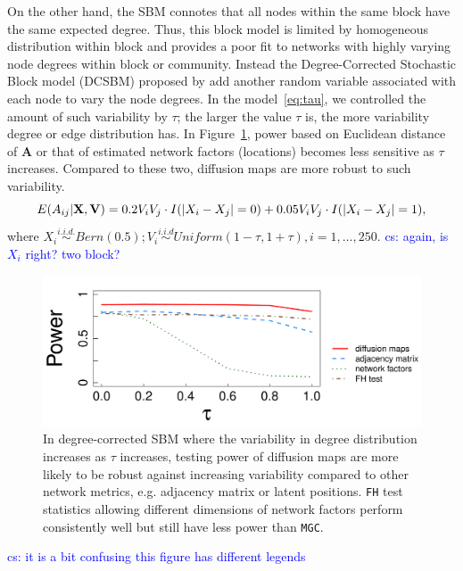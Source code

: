 \documentclass[11pt]{article}
\theoremstyle{definition}
\newcommand{\cs}[1]{\textcolor{blue}{cs: #1}}
\begin{document}
On the other hand, the SBM connotes that all nodes within the same block have the same expected degree. Thus, this block model is limited by homogeneous distribution within block and provides a poor fit to networks with highly varying node degrees within block or community. Instead the Degree-Corrected Stochastic Block model (DCSBM) proposed by \cite{karrer2011stochastic} add another random variable associated with each node to vary the node degrees. In the model~\ref{eq:tau}, we controlled the amount of such variability by $\tau$; the larger the value $\tau$ is, the more variability degree or edge distribution has. In Figure~\ref{fig:dcSBM}, power based on Euclidean distance of $\mathbf{A}$ or that of estimated network factors (locations) becomes less sensitive as $\tau$ increases. Compared to these two, diffusion maps are more robust to such variability. 
\vspace*{-0.4cm}
\begin{equation}
E( A_{ij} | \mathbf{X}, \mathbf{V} )  = 0.2 V_{i} V_{j} \cdot I ( |X_{i} - X_{j}| = 0 ) + 0.05 V_{i} V_{j} \cdot I(|X_{i} - X_{j}| = 1),
\label{eq:tau}
\vspace*{-0.4cm}
\end{equation} 
where $X_{i} \overset{i.i.d.}{\sim} Bern(0.5);  V_{i} \overset{i.i.d}{\sim} Uniform(1 - \tau, 1 + \tau), i = 1, \ldots, 250.$
\cs{again, is $X_i$ right? two block?}
\begin{figure}[ht]
	\centering
	\includegraphics[width=0.7\linewidth]{tau_simple.pdf}
	\caption{In degree-corrected SBM where the variability in degree distribution increases as $\tau$ increases, testing power of diffusion maps are more likely to be robust against increasing variability compared to other network metrics, e.g. adjacency matrix or latent positions. \texttt{FH} test statistics allowing different dimensions of network factors perform consistently well but still have less power than \texttt{MGC}.}
	\label{fig:dcSBM}
	\vspace*{-0.5cm}
\end{figure}	
\cs{it is a bit confusing this figure has different legends}
\end{document}

